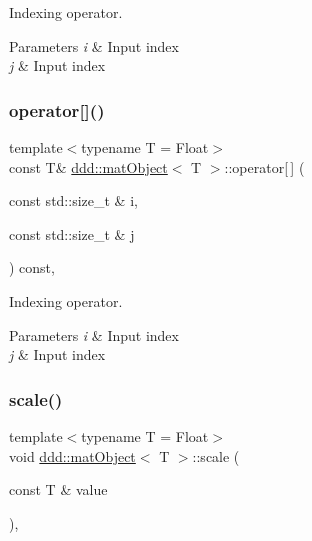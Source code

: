 Indexing operator. 


\begin{DoxyParams}{Parameters}
{\em i} & Input index \\
\hline
{\em j} & Input index \\
\hline
\end{DoxyParams}
\mbox{\label{classddd_1_1mat_object_ae87764e4910b1323233f611c796946a2}} 
\subsubsection{\texorpdfstring{operator[]()}{operator[]()}\hspace{0.1cm}{\footnotesize\ttfamily [2/2]}}
{\footnotesize\ttfamily template$<$typename T  = Float$>$ \\
const T\& \hyperlink{classddd_1_1mat_object}{ddd\+::mat\+Object}$<$ T $>$\+::operator\mbox{[}$\,$\mbox{]} (\begin{DoxyParamCaption}\item[{const std\+::size\+\_\+t \&}]{i,  }\item[{const std\+::size\+\_\+t \&}]{j }\end{DoxyParamCaption}) const\hspace{0.3cm}{\ttfamily [inline]}, {\ttfamily [inherited]}}



Indexing operator. 


\begin{DoxyParams}{Parameters}
{\em i} & Input index \\
\hline
{\em j} & Input index \\
\hline
\end{DoxyParams}
\mbox{\label{classddd_1_1mat_object_a078f66a56b01fc18cc9864ec736611e5}} 
\subsubsection{\texorpdfstring{scale()}{scale()}}
{\footnotesize\ttfamily template$<$typename T  = Float$>$ \\
void \hyperlink{classddd_1_1mat_object}{ddd\+::mat\+Object}$<$ T $>$\+::scale (\begin{DoxyParamCaption}\item[{const T \&}]{value }\end{DoxyParamCaption})\hspace{0.3cm}{\ttfamily [inline]}, {\ttfamily [inherited]}}



